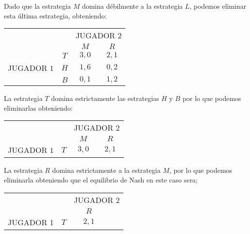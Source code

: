 \documentclass[12pt]{article}
\begin{document}
\begin{enumerate}
\begin{alphalist}
\begin{flushleft}
            Dado que la estrategia $M$ domina débilmente a la estrategia $L$, podemos eliminar esta última estrategia, obteniendo:
            \begin{center}    
                \setlength{\extrarowheight}{0pt}
                \begin{tabular}{cc|c|c|}
                    & \multicolumn{1}{c}{} & \multicolumn{2}{c}{JUGADOR $2$}\\
                    & \multicolumn{1}{c}{} & \multicolumn{1}{c}{$M$} & \multicolumn{1}{c}{$R$} \\\cline{3-4}
                    & $T$ & $3,0$ & $2,1$ \\\cline{3-4}
                    {JUGADOR $1$} & $H$ & $1,6$ & $0,2$ \\\cline{3-4}
                    & $B$ & $0,1$ & $1,2$ \\\cline{3-4}
                \end{tabular}
            \end{center}
            La estrategia $T$ domina estrictamente las estrategias $H$ y $B$ por lo que podemos eliminarlas obteniendo:
            \begin{center}    
                \setlength{\extrarowheight}{0pt}
                \begin{tabular}{cc|c|c|}
                    & \multicolumn{1}{c}{} & \multicolumn{2}{c}{JUGADOR $2$}\\
                    & \multicolumn{1}{c}{} & \multicolumn{1}{c}{$M$} & \multicolumn{1}{c}{$R$} \\\cline{3-4}
                    {JUGADOR $1$} & $T$ & $3,0$ & $2,1$ \\\cline{3-4}
                \end{tabular}
            \end{center}
            La estrategia $R$ domina estrictamente a la estrategia $M$, por lo que podemos eliminarla obteniendo que el equilibrio de Nash en este caso sera;
            \begin{center}    
                \setlength{\extrarowheight}{0pt}
                \begin{tabular}{cc|c|c}
                    & \multicolumn{1}{c}{} & \multicolumn{2}{c}{JUGADOR 2}\\
                    & \multicolumn{1}{c}{} & \multicolumn{1}{c}{$R$}  & \multicolumn{1}{c}{} \\\cline{3-3}
                    {JUGADOR 1} & $T$ & $2,1$ & \\\cline{3-3}
                \end{tabular}

\end{center}
\end{flushleft}
\end{alphalist}
\end{enumerate}
\end{document}
